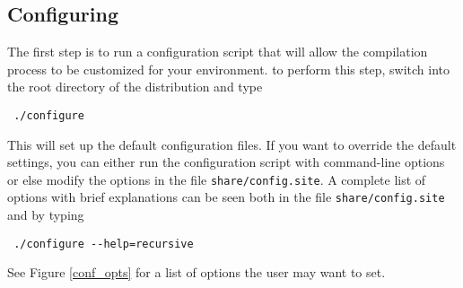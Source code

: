 \subsection{Configuring}\label{configuring}

The first step is to run a configuration script that will allow the
compilation process to be customized for your environment. to perform this
step, switch into the root directory of the distribution and type
{\color{Brown}
\begin{verbatim}
 ./configure 
\end{verbatim}
} This will set up the default configuration files. If you want to override
the default settings, you can either run the configuration script with
command-line options or else modify the options in the file
{\color{Brown}\texttt{share/config.site}}. A complete list of options with
brief explanations can be seen both in the file
{\color{Brown}\texttt{share/config.site}} and by typing 
{\color{Brown}
\begin{verbatim}
 ./configure --help=recursive 
\end{verbatim}
}
See Figure \ref{conf_opts} for a list of options the user may want to set. 

